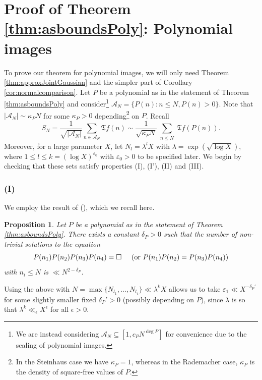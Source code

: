 \documentclass[11pt]{tran-l}
\newtheorem{prop}[theorem]{Proposition}
\theoremstyle{definition}
\theoremstyle{remark}
\numberwithin{equation}{section}
\begin{document}
\section{Proof of Theorem \ref{thm:asboundsPoly}: Polynomial images}
To prove our theorem for polynomial images, we will only need Theorem \ref{thm:approxJointGaussian} and the simpler part of Corollary \ref{cor:normalcomparison}. Let $P$ be a polynomial as in the statement of Theorem \ref{thm:asboundsPoly} and consider\footnote{We are instead considering $\mathcal A_N\subseteq [1, c_PN^{\deg P}]$ for convenience due to the scaling of polynomial images.} $\mathcal A_N = \{P(n) : n\leq N, P(n)>0\}$. Note that $\lvert \mathcal A_N\rvert \sim \kappa_PN$ for some $\kappa_P>0$ depending\footnote{In the Steinhaus case we have $\kappa_P=1$, whereas in the Rademacher case, $\kappa_P$ is the density of square-free values of $P$.} on $P$. Recall 
\begin{equation}\label{eq:S_NdefPoly}
     S_N = \frac{1}{\sqrt{\lvert \mathcal A_N\rvert}}\sum_{n\in\mathcal A_N} \mathfrak Tf(n) \sim \frac{1}{\sqrt{\kappa_P N}} \sum_{\substack{n\leq N}} \mathfrak Tf(P(n)).
\end{equation}
Moreover, for a large parameter $X$, let $N_l = \lambda^l X$ with $\lambda = \exp\left(\sqrt{\log X}\right)$, where $1\leq l\leq k = (\log X)^{\varepsilon_0}$ with $\varepsilon_0>0$ to be specified later. We begin by checking that these sets satisfy properties (I), (I'), (II) and (III). 

\subsubsection*{(I)} We employ the result of \cite{ChinisShala2025}
 (\cite{KlurmanShkredovXu2023}), which we recall here. 
 
 \begin{prop}
 Let $P$ be a polynomial as in the statement of Theorem \ref{thm:asboundsPoly}. There exists a constant $\delta_P>0$ such that the number of non-trivial solutions to the equation 
 \begin{equation*}
     P(n_1)P(n_2)P(n_3)P(n_4) = \square \hspace{0.5cm} (\text{or }P(n_1)P(n_2) = P(n_3)P(n_4))
 \end{equation*} with $n_i\leq N$ is $\ll N^{2-\delta_P}$. 
 \end{prop}
 
Using the above with $N = \max\{N_{l_1}, \ldots, N_{l_4}\}\ll \lambda^k X$ allows us to take $\varepsilon_1 \ll X^{-\delta_P'}$ for some slightly smaller fixed $\delta_P'>0$ (possibly depending on $P$), since $\lambda$ is so that $\lambda^k\ll_{\epsilon}X^{\epsilon}$ for all $\epsilon>0$. 
\end{document}
